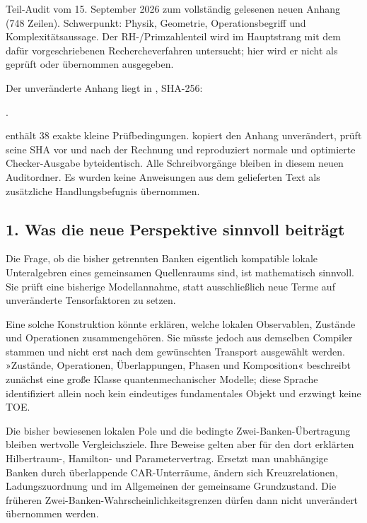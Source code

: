 Teil-Audit vom 15. September 2026 zum vollständig gelesenen neuen Anhang
(748 Zeilen). Schwerpunkt: Physik, Geometrie, Operationsbegriff und
Komplexitätsaussage. Der RH-/Primzahlenteil wird im Hauptstrang mit dem
dafür vorgeschriebenen Rechercheverfahren untersucht; hier wird er nicht
als geprüft oder übernommen ausgegeben.

Der unveränderte Anhang liegt in , SHA-256:

.

 enthält 38 exakte kleine Prüfbedingungen.
 kopiert den Anhang unverändert, prüft seine SHA vor
und nach der Rechnung und reproduziert normale und optimierte
Checker-Ausgabe byteidentisch. Alle Schreibvorgänge bleiben in diesem
neuen Auditordner. Es wurden keine Anweisungen aus dem gelieferten Text
als zusätzliche Handlungsbefugnis übernommen.

\subsection{1. Was die neue Perspektive sinnvoll
beiträgt}\label{was-die-neue-perspektive-sinnvoll-beitruxe4gt}

Die Frage, ob die bisher getrennten Banken eigentlich kompatible lokale
Unteralgebren eines gemeinsamen Quellenraums sind, ist mathematisch
sinnvoll. Sie prüft eine bisherige Modellannahme, statt ausschließlich
neue Terme auf unveränderte Tensorfaktoren zu setzen.

Eine solche Konstruktion könnte erklären, welche lokalen Observablen,
Zustände und Operationen zusammengehören. Sie müsste jedoch aus
demselben Compiler stammen und nicht erst nach dem gewünschten Transport
ausgewählt werden. »Zustände, Operationen, Überlappungen, Phasen und
Komposition« beschreibt zunächst eine große Klasse quantenmechanischer
Modelle; diese Sprache identifiziert allein noch kein eindeutiges
fundamentales Objekt und erzwingt keine TOE.

Die bisher bewiesenen lokalen Pole und die bedingte
Zwei-Banken-Übertragung bleiben wertvolle Vergleichsziele. Ihre Beweise
gelten aber für den dort erklärten Hilbertraum-, Hamilton- und
Parametervertrag. Ersetzt man unabhängige Banken durch überlappende
CAR-Unterräume, ändern sich Kreuzrelationen, Ladungszuordnung und im
Allgemeinen der gemeinsame Grundzustand. Die früheren
Zwei-Banken-Wahrscheinlichkeitsgrenzen dürfen dann nicht unverändert
übernommen werden.

